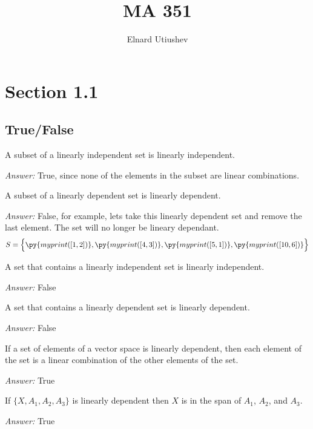 \documentclass[letter]{article}
\title{MA 351}
\author{Elnard Utiushev}
\newcommand{\ans}{\textit{Answer: }}
\newenvironment{question}[2][Question]{\begin{trivlist}
\item[\hskip \labelsep {\bfseries #1}\hskip \labelsep {\bfseries #2.}]}{\end{trivlist}}
\begin{document}
\maketitle

\section{Section 1.1}
\subsection{True/False}

\begin{question}{1.1}
  A subset of a linearly independent set is linearly independent.
  
  \ans True, since none of the elements in the subset are linear combinations. 
\end{question} 

\begin{question}{1.2}
  A subset of a linearly dependent set is linearly dependent. 

  \ans False, for example, lets take this linearly dependent set and remove 
  the last element. The set will no longer be lineary dependant.
  $$S = \Big\{
    \py{myprint([1, 2])},
    \py{myprint([4, 3])},
    \py{myprint([5, 1])},
    \py{myprint([10, 6])}
  \Big\}
  $$
\end{question}

\begin{question}{1.3}
  A set that contains a linearly independent set is linearly independent.

  \ans False
\end{question}

\begin{question}{1.4}
  A set that contains a linearly dependent set is linearly dependent.

  \ans False
\end{question}

\begin{question}{1.5}
  If a set of elements of a vector space is linearly dependent, then each element
  of the set is a linear combination of the other elements of the set.

  \ans True
\end{question}

\begin{question}{1.8}
  If $\{X, A_1, A_2, A_3\}$ is linearly dependent then $X$ is in the span of $A_1$, $A_2$, and $A_3$.

  \ans True
\end{question}
\end{document}
